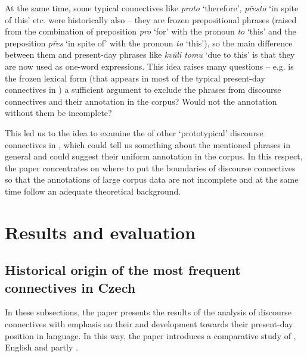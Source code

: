 \documentclass[output=paper]{langsci/langscibook.cls}
\begin{document}
At the same time, some typical  connectives like\textit{ proto} `therefore', \textit{přesto }`in spite of this' etc. were historically also  – they are frozen prepositional phrases (raised from the combination of preposition \textit{pro} `for' with the pronoun \textit{to} `this' and the preposition \textit{přes} `in spite of' with the pronoun \textit{to} `this'), so the main difference between them and present-day phrases like \textit{kvůli tomu} `due to this' is that they are now used as one-word expressions. This idea raises many questions – e.g. is the frozen lexical form (that appears in most of the typical present-day connectives in ) a sufficient argument to exclude the  phrases from discourse connectives and their annotation in the corpus? Would not the annotation without them be incomplete? 

This led us to the idea to examine the  of other `prototypical' discourse connectives in , which could tell us something about the mentioned  phrases in general and could suggest their uniform annotation in the corpus. In this respect, the paper concentrates on where to put the boundaries of discourse connectives so that the annotations of large corpus data are not incomplete and at the same time follow an adequate theoretical background.


\section{Results and evaluation}

\subsection{Historical origin of the most frequent connectives in Czech}

In these subsections, the paper presents the results of the analysis of discourse connectives with emphasis on their  and development towards their present-day position in language. In this way, the paper introduces a comparative study of , English and partly .
\end{document}
